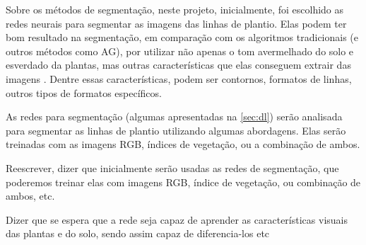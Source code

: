 \documentclass[12pt, a4paper, english, brazil]{article}
\newcommand{\textRed}[1]{{{\color{red} #1}}}
\begin{document}
Sobre os métodos de segmentação, neste projeto, inicialmente, foi escolhido as redes neurais para segmentar as imagens das linhas de plantio. Elas podem ter bom resultado na segmentação, em comparação com os algoritmos tradicionais (e outros métodos como AG), por utilizar não apenas o tom avermelhado do solo e esverdado da plantas, mas outras características que elas conseguem extrair das imagens \cite{Silva_2020}. Dentre essas características, podem ser contornos, formatos de linhas, outros tipos de formatos específicos. 

As redes para segmentação (algumas apresentadas na \autoref{sec:dl}) serão analisada para segmentar as linhas de plantio utilizando algumas abordagens. Elas serão treinadas com as imagens RGB, índices de vegetação, ou a combinação de ambos.


\textRed{Reescrever, dizer que inicialmente serão usadas as redes de segmentação, que poderemos treinar elas com imagens RGB, índice de vegetação, ou combinação de ambos, etc.

Dizer que se espera que a rede seja capaz de aprender as características visuais das plantas e do solo, sendo assim capaz de diferencia-los etc}
\end{document}

